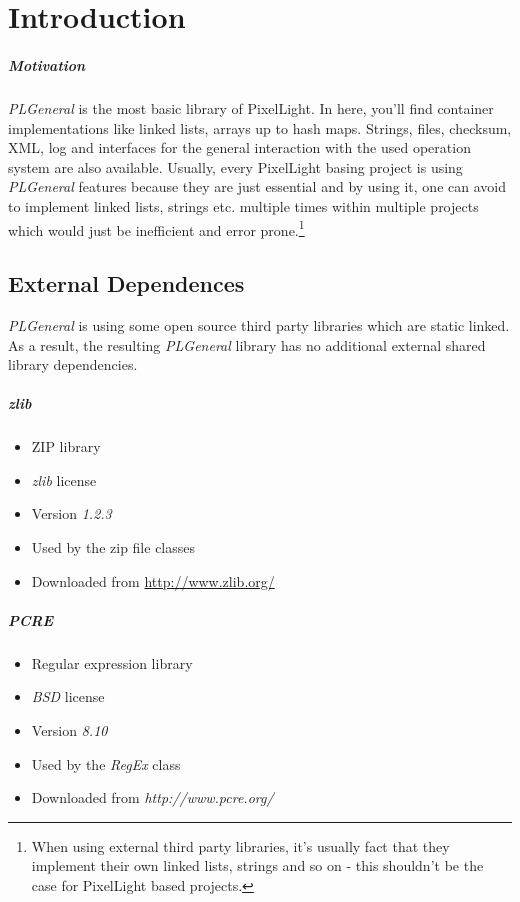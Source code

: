 \chapter{Introduction}


\paragraph{Motivation}
\emph{PLGeneral} is the most basic library of PixelLight. In here, you'll find container implementations like linked lists, arrays up to hash maps. Strings, files, checksum, XML, log and interfaces for the general interaction with the used operation system are also available. Usually, every PixelLight basing project is using \emph{PLGeneral} features because they are just essential and by using it, one can avoid to implement linked lists, strings etc. multiple times within multiple projects which would just be inefficient and error prone.\footnote{When using external third party libraries, it's usually fact that they implement their own linked lists, strings and so on - this shouldn't be the case for PixelLight based projects.}




\section{External Dependences}
\emph{PLGeneral} is using some open source third party libraries which are static linked. As a result, the resulting \emph{PLGeneral} library has no additional external shared library dependencies.


\paragraph{zlib}
\begin{itemize}
\item ZIP library
\item \emph{zlib} license
\item Version \emph{1.2.3}
\item Used by the zip file classes
\item Downloaded from \url{http://www.zlib.org/}
\end{itemize}


\paragraph{PCRE}
\begin{itemize}
\item Regular expression library
\item \emph{BSD} license
\item Version \emph{8.10}
\item Used by the \emph{RegEx} class
\item Downloaded from \emph{http://www.pcre.org/}
\end{itemize}
